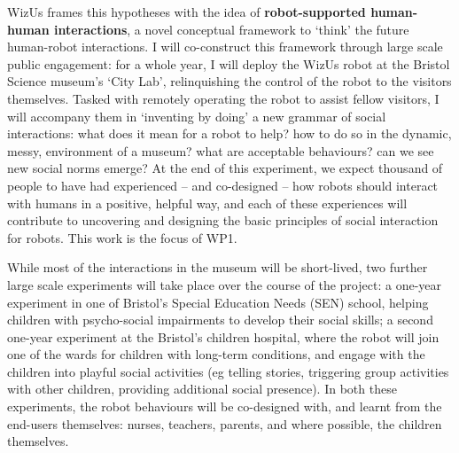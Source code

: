 \documentclass[11pt,a4paper]{report}
\newcommand{\project}{WizUs\xspace}
\begin{document}
\project frames this hypotheses with the idea of \textbf{robot-supported
human-human interactions}, a novel conceptual framework to `think' the future
human-robot interactions. I will co-construct this framework through large scale
public engagement: for a whole year, I will deploy the \project robot at the
Bristol Science museum's `City Lab', relinquishing the control of the robot to
the visitors themselves. Tasked with remotely operating the robot to assist
fellow visitors, I will accompany them in `inventing by doing' a new grammar of
social interactions: what does it mean for a robot to help? how to do so in the
dynamic, messy, environment of a museum? what are acceptable behaviours? can we
see new social norms emerge? At the end of this experiment, we expect thousand
of people to have had experienced -- and co-designed -- how robots should
interact with humans in a positive, helpful way, and each of these experiences
will contribute to uncovering and designing the basic principles of social
interaction for robots. This work is the focus of WP1.

While most of the interactions in the museum will be short-lived, two further
large scale experiments will take place over the course of the project: a
one-year experiment in one of Bristol's Special Education Needs (SEN) school,
helping children with psycho-social impairments to develop their social skills;
a second one-year  experiment at the Bristol's children hospital, where the
robot will join one of the wards for children with long-term conditions, and
engage with the children into playful social activities (eg telling stories,
triggering group activities with other children, providing additional social
presence). In both these experiments, the robot behaviours will be co-designed
with, and learnt from the end-users themselves: nurses, teachers, parents, and
where possible, the children themselves.
\end{document}
